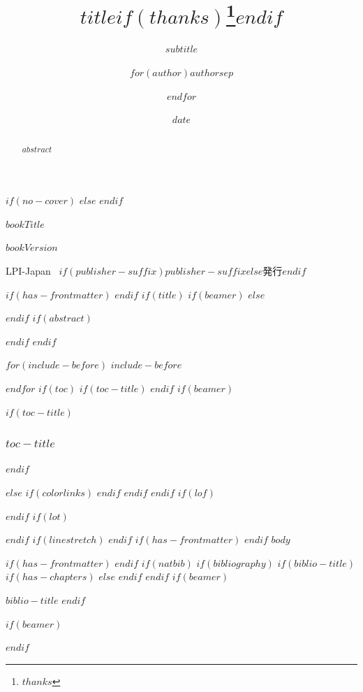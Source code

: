 \documentclass[
$if(fontsize)$
  $fontsize$,
$endif$
$if(papersize)$
  $papersize$paper,
$endif$
$if(beamer)$
  ignorenonframetext,
$if(handout)$
  handout,
$endif$
$if(aspectratio)$
  aspectratio=$aspectratio$,
$endif$
$endif$
$for(classoption)$
  $classoption$$sep$,
$endfor$
]{$documentclass$}
\title{$title$$if(thanks)$\thanks{$thanks$}$endif$}
\subtitle{$subtitle$}
\author{$for(author)$$author$$sep$ \and $endfor$}
\date{$date$}
\institute{$for(institute)$$institute$$sep$ \and $endfor$}
\newif\ifbibliography
\begin{document}
$if(no-cover)$
$else$
\thispagestyle{empty}
\null
\cleardoublepage
$endif$

\thispagestyle{empty}
\begin{center}
  \vspace*{6cm}
  {\Huge $bookTitle$}

  \vfill

  {\Large $bookVersion$}

  {\Large LPI-Japan \, $if(publisher-suffix)$$publisher-suffix$$else$発行$endif$}

  \vspace*{4cm}
\end{center}
\newpage

$if(has-frontmatter)$
\frontmatter
$endif$
$if(title)$
$if(beamer)$
\frame{\titlepage}
$else$
\maketitle
$endif$
$if(abstract)$
\begin{abstract}
$abstract$
\end{abstract}
$endif$
$endif$


$for(include-before)$
$include-before$

$endfor$
\newpage
$if(toc)$
$if(toc-title)$
\renewcommand*\contentsname{$toc-title$}
$endif$
$if(beamer)$
\begin{frame}[allowframebreaks]
$if(toc-title)$
  \frametitle{$toc-title$}
$endif$
  \tableofcontents[hideallsubsections]
\end{frame}
$else$
{
$if(colorlinks)$
\hypersetup{linkcolor=$if(toccolor)$$toccolor$$else$$endif$}
$endif$
\setcounter{tocdepth}{$toc-depth$}
\tableofcontents
\newpage
}
$endif$
$endif$
$if(lof)$
\listoffigures
$endif$
$if(lot)$
\listoftables
$endif$
$if(linestretch)$
$endif$
$if(has-frontmatter)$
\mainmatter
$endif$
$body$

$if(has-frontmatter)$
\backmatter
$endif$
$if(natbib)$
$if(bibliography)$
$if(biblio-title)$
$if(has-chapters)$
\renewcommand\bibname{$biblio-title$}
$else$
\renewcommand\refname{$biblio-title$}
$endif$
$endif$
$if(beamer)$
\begin{frame}[allowframebreaks]{$biblio-title$}
  \bibliographytrue
$endif$
  
$if(beamer)$
\end{frame}
$endif$
\end{document}
